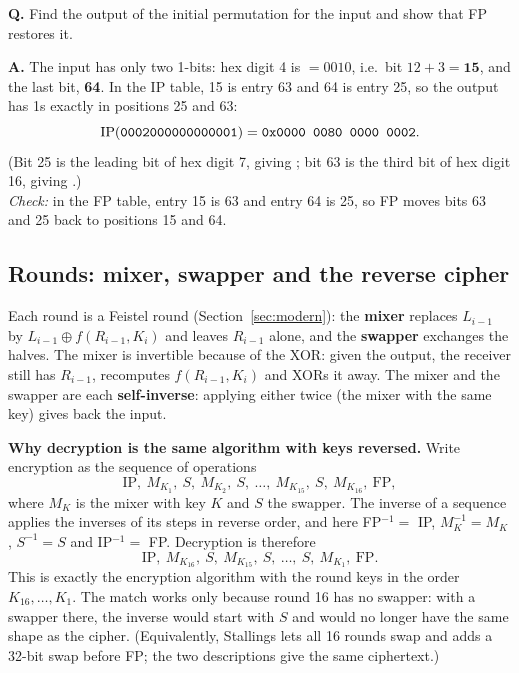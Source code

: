 \begin{worked}
\textbf{Q.} Find the output of the initial permutation for the input  and show that FP restores it.

\textbf{A.} The input has only two 1-bits: hex digit 4 is  $= 0010$, i.e.\ bit $12 + 3 = \mathbf{15}$, and the last bit, \textbf{64}. In the IP table, 15 is entry 63 and 64 is entry 25, so the output has 1s exactly in positions 25 and 63:
\[
\text{IP}(\texttt{0002000000000001}) = \texttt{0x0000 0080 0000 0002}.
\]
(Bit 25 is the leading bit of hex digit 7, giving ; bit 63 is the third bit of hex digit 16, giving .)\\
\emph{Check:} in the FP table, entry 15 is 63 and entry 64 is 25, so FP moves bits 63 and 25 back to positions 15 and 64.
\end{worked}

\subsection{Rounds: mixer, swapper and the reverse cipher}
Each round is a Feistel round (Section~\ref{sec:modern}): the \textbf{mixer} replaces $L_{i-1}$ by $L_{i-1} \oplus f(R_{i-1}, K_i)$ and leaves $R_{i-1}$ alone, and the \textbf{swapper} exchanges the halves. The mixer is invertible because of the XOR: given the output, the receiver still has $R_{i-1}$, recomputes $f(R_{i-1}, K_i)$ and XORs it away. The mixer and the swapper are each \textbf{self-inverse}: applying either twice (the mixer with the same key) gives back the input.

\textbf{Why decryption is the same algorithm with keys reversed.} Write encryption as the sequence of operations
\[
\text{IP},\ M_{K_1},\ S,\ M_{K_2},\ S,\ \dots,\ M_{K_{15}},\ S,\ M_{K_{16}},\ \text{FP},
\]
where $M_K$ is the mixer with key $K$ and $S$ the swapper. The inverse of a sequence applies the inverses of its steps in reverse order, and here FP$^{-1} =$ IP, $M_K^{-1} = M_K$, $S^{-1} = S$ and IP$^{-1} =$ FP. Decryption is therefore
\[
\text{IP},\ M_{K_{16}},\ S,\ M_{K_{15}},\ S,\ \dots,\ S,\ M_{K_1},\ \text{FP}.
\]
This is exactly the encryption algorithm with the round keys in the order $K_{16}, \dots, K_1$. The match works only because round 16 has no swapper: with a swapper there, the inverse would start with $S$ and would no longer have the same shape as the cipher.  (Equivalently, Stallings lets all 16 rounds swap and adds a 32-bit swap before FP; the two descriptions give the same ciphertext.)

